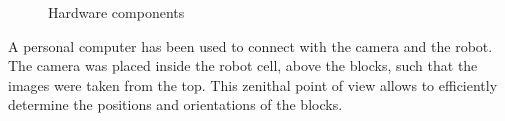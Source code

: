 \begin{figure}[H]
	\hfill
	\hfill
	\caption{Hardware components}
\end{figure}

A personal computer has been used to connect with the camera and the robot. The camera was placed inside the robot cell, above the blocks, such that the images were taken from the top. This zenithal point of view allows to efficiently determine the positions and orientations of the blocks. 

